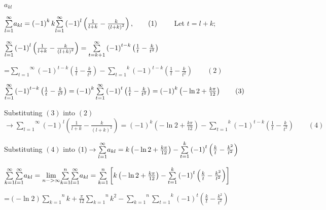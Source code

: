 \documentclass{ctexart}
\begin{document}
$a_{kl}$

\bigskip 

$\overset{\infty }{\underset{l=1}{\sum }}a_{kl}=\left( -1\right) ^{k}k%
\overset{\infty }{\underset{l=1}{\sum }}\left( -1\right) ^{l}\left( \frac{1}{%
l+k}-\frac{k}{\left( l+k\right) ^{2}}\right) ,\qquad \left( 1\right) \qquad $%
Let $t=l+k;$

$\overset{\infty }{\underset{l=1}{\sum }}\left( -1\right) ^{l}\left( \frac{1%
}{l+k}-\frac{k}{\left( l+k\right) ^{2}}\right) =\overset{\infty }{\underset{%
t=k+1}{\sum }}\left( -1\right) ^{t-k}\left( \frac{1}{t}-\frac{k}{t^{2}}%
\right) $

=$\overset{\infty }{\underset{t=1}{\sum }}\left( -1\right) ^{t-k}\left( 
\frac{1}{t}-\frac{k}{t^{2}}\right) -\overset{k}{\underset{t=1}{\sum }}\left(
-1\right) ^{t-k}\left( \frac{1}{t}-\frac{k}{t^{2}}\right) \qquad \left(
2\right) $

$\overset{\infty }{\underset{t=1}{\sum }}\left( -1\right) ^{t-k}\left( \frac{%
1}{t}-\frac{k}{t^{2}}\right) =\left( -1\right) ^{k}\overset{\infty }{%
\underset{t=1}{\sum }}\left( -1\right) ^{t}\left( \frac{1}{t}-\frac{k}{t^{2}}%
\right) =\left( -1\right) ^{k}\left( -\ln 2+\frac{k\pi }{12}\right) \qquad
\left( 3\right) $

Substituting $\left( 3\right) $ into $\left( 2\right) $ $\rightarrow \overset%
{\infty }{\underset{l=1}{\sum }}\left( -1\right) ^{l}\left( \frac{1}{l+k}-%
\frac{k}{\left( l+k\right) ^{2}}\right) =\left( -1\right) ^{k}\left( -\ln 2+%
\frac{k\pi }{12}\right) -\overset{k}{\underset{t=1}{\sum }}\left( -1\right)
^{t-k}\left( \frac{1}{t}-\frac{k}{t^{2}}\right) \qquad \left( 4\right) $

Substituting $\left( 4\right) $ into $\left( 1\right) \rightarrow \overset{%
\infty }{\underset{l=1}{\sum }}a_{kl}=k\left( -\ln 2+\frac{k\pi }{12}\right)
-\overset{k}{\underset{t=1}{\sum }}\left( -1\right) ^{t}\left( \frac{k}{t}-%
\frac{k^{2}}{t^{2}}\right) $

$\overset{\infty }{\underset{k=1}{\sum }}\overset{\infty }{\underset{l=1}{%
\sum }}a_{kl}=\underset{n->\infty }{\lim }\overset{n}{\underset{k=1}{\sum }}%
\overset{\infty }{\underset{l=1}{\sum }}a_{kl}=\overset{n}{\underset{k=1}{%
\sum }}\left[ k\left( -\ln 2+\frac{k\pi }{12}\right) -\overset{k}{\underset{%
t=1}{\sum }}\left( -1\right) ^{t}\left( \frac{k}{t}-\frac{k^{2}}{t^{2}}%
\right) \right] $

=$\left( -\ln 2\right) \overset{n}{\underset{k=1}{\sum }}k+\frac{\pi }{12}%
\overset{n}{\underset{k=1}{\sum }}k^{2}-\overset{n}{\underset{k=1}{\sum }}%
\overset{k}{\underset{t=1}{\sum }}\left( -1\right) ^{t}\left( \frac{k}{t}-%
\frac{k^{2}}{t^{2}}\right) $
\end{document}
